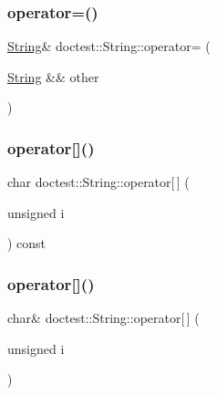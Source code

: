 \mbox{\label{classdoctest_1_1_string_a6099dbedeb150eb5659c7aa5dcea1727}} 
\subsubsection{\texorpdfstring{operator=()}{operator=()}\hspace{0.1cm}{\footnotesize\ttfamily [2/2]}}
{\footnotesize\ttfamily \hyperlink{classdoctest_1_1_string}{String}\& doctest\+::\+String\+::operator= (\begin{DoxyParamCaption}\item[{\hyperlink{classdoctest_1_1_string}{String} \&\&}]{other }\end{DoxyParamCaption})}

\mbox{\label{classdoctest_1_1_string_adf69290bc23e8c7bf60a9bcf765ebc10}} 
\subsubsection{\texorpdfstring{operator[]()}{operator[]()}\hspace{0.1cm}{\footnotesize\ttfamily [1/2]}}
{\footnotesize\ttfamily char doctest\+::\+String\+::operator\mbox{[}$\,$\mbox{]} (\begin{DoxyParamCaption}\item[{unsigned}]{i }\end{DoxyParamCaption}) const}

\mbox{\label{classdoctest_1_1_string_acd37c72485c1277fc673f6b328138b40}} 
\subsubsection{\texorpdfstring{operator[]()}{operator[]()}\hspace{0.1cm}{\footnotesize\ttfamily [2/2]}}
{\footnotesize\ttfamily char\& doctest\+::\+String\+::operator\mbox{[}$\,$\mbox{]} (\begin{DoxyParamCaption}\item[{unsigned}]{i }\end{DoxyParamCaption})}

